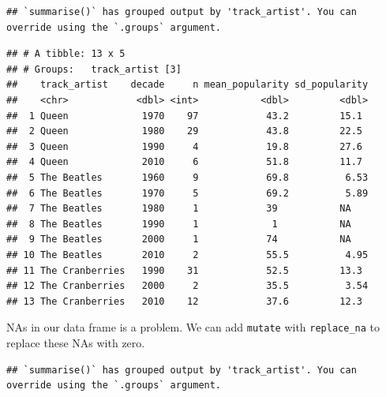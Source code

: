 \documentclass[
]{book}
\newenvironment{Shaded}{\begin{snugshade}}{\end{snugshade}}
\newcommand{\DataTypeTok}[1]{\textcolor[rgb]{0.13,0.29,0.53}{#1}}
\newcommand{\DecValTok}[1]{\textcolor[rgb]{0.00,0.00,0.81}{#1}}
\newcommand{\KeywordTok}[1]{\textcolor[rgb]{0.13,0.29,0.53}{\textbf{#1}}}
\newcommand{\NormalTok}[1]{#1}
\newcommand{\OperatorTok}[1]{\textcolor[rgb]{0.81,0.36,0.00}{\textbf{#1}}}
\newcommand{\StringTok}[1]{\textcolor[rgb]{0.31,0.60,0.02}{#1}}
\begin{document}
\begin{verbatim}
## `summarise()` has grouped output by 'track_artist'. You can override using the `.groups` argument.
\end{verbatim}

\begin{verbatim}
## # A tibble: 13 x 5
## # Groups:   track_artist [3]
##    track_artist    decade     n mean_popularity sd_popularity
##    <chr>            <dbl> <int>           <dbl>         <dbl>
##  1 Queen             1970    97            43.2         15.1 
##  2 Queen             1980    29            43.8         22.5 
##  3 Queen             1990     4            19.8         27.6 
##  4 Queen             2010     6            51.8         11.7 
##  5 The Beatles       1960     9            69.8          6.53
##  6 The Beatles       1970     5            69.2          5.89
##  7 The Beatles       1980     1            39           NA   
##  8 The Beatles       1990     1             1           NA   
##  9 The Beatles       2000     1            74           NA   
## 10 The Beatles       2010     2            55.5          4.95
## 11 The Cranberries   1990    31            52.5         13.3 
## 12 The Cranberries   2000     2            35.5          3.54
## 13 The Cranberries   2010    12            37.6         12.3
\end{verbatim}

NAs in our data frame is a problem. We can add \texttt{mutate} with \texttt{replace\_na} to replace these NAs with zero.

\begin{Shaded}
\end{Shaded}

\begin{verbatim}
## `summarise()` has grouped output by 'track_artist'. You can override using the `.groups` argument.
\end{verbatim}
\end{document}
